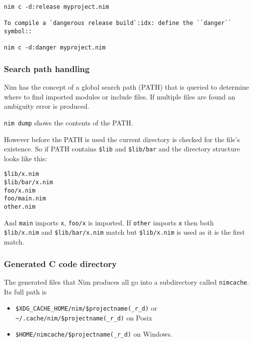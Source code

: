 \begin{verbatim}
nim c -d:release myproject.nim

To compile a `dangerous release build`:idx: define the ``danger`` symbol::

nim c -d:danger myproject.nim
\end{verbatim}

\hypertarget{search-path-handling}{%
\subsubsection{Search path handling}\label{search-path-handling}}

Nim has the concept of a global search path (PATH) that is queried to
determine where to find imported modules or include files. If multiple
files are found an ambiguity error is produced.

\texttt{nim\ dump} shows the contents of the PATH.

However before the PATH is used the current directory is checked for the
file's existence. So if PATH contains \texttt{\$lib} and
\texttt{\$lib/bar} and the directory structure looks like this:

\begin{verbatim}
$lib/x.nim
$lib/bar/x.nim
foo/x.nim
foo/main.nim
other.nim
\end{verbatim}

And \texttt{main} imports \texttt{x}, \texttt{foo/x} is imported. If
\texttt{other} imports \texttt{x} then both \texttt{\$lib/x.nim} and
\texttt{\$lib/bar/x.nim} match but \texttt{\$lib/x.nim} is used as it is
the first match.

\hypertarget{generated-c-code-directory}{%
\subsubsection{Generated C code
directory}\label{generated-c-code-directory}}

The generated files that Nim produces all go into a subdirectory called
\texttt{nimcache}. Its full path is

\begin{itemize}
\tightlist
\item
  \texttt{\$XDG\_CACHE\_HOME/nim/\$projectname(\_r\textbar{}\_d)} or
  \texttt{\textasciitilde{}/.cache/nim/\$projectname(\_r\textbar{}\_d)}
  on Posix
\item
  \texttt{\$HOME/nimcache/\$projectname(\_r\textbar{}\_d)} on Windows.
\end{itemize}

